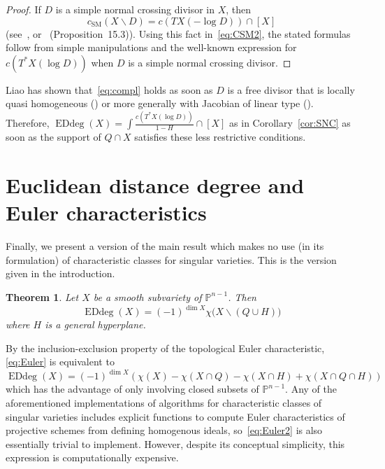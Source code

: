\documentclass[11pt]{amsart}
\newtheorem{theorem}{Theorem}[section]
\numberwithin{equation}{section}
\newcommand{\Pbb}{{\mathbb{P}}}
\newcommand{\csm}{{c_{\text{SM}}}}
\DeclareMathOperator{\Edd}{EDdeg}
\begin{document}
\begin{proof}
If $D$ is a simple normal crossing divisor in $X$, then
\begin{equation}\label{eq:compl}
\csm(X\smallsetminus D) = c(TX(-\log D))\cap [X]
\end{equation}
(see~\cite{MR2001d:14008}, or~\cite{MR1893006} (Proposition~15.3)).
Using this fact in~\eqref{eq:CSM2}, the stated formulas follow from simple 
manipulations and the well-known expression for $c(T^*X(\log D))$ when
$D$ is a simple normal crossing divisor.
\end{proof}

Liao has shown that~\eqref{eq:compl} holds as soon as $D$ is a free divisor
that is locally quasi homogeneous (\cite{Liao1}) or more generally with Jacobian
of linear type (\cite{Liao2}). Therefore, $\Edd(X) = \int \frac{c(T^*X(\log D))}{1-H}\cap [X]$
as in Corollary~\ref{cor:SNC} as soon as the support of $Q\cap X$ satisfies these 
less restrictive conditions.


\section{Euclidean distance degree and Euler characteristics}\label{s:Euler}

Finally, we present a version of the main result which makes no use (in its formulation)
of characteristic classes for singular varieties. This is the version given in the introduction.

\begin{theorem}\label{thm:Euler}
Let $X$ be a smooth subvariety of $\Pbb^{n-1}$. Then 
\begin{equation}\label{eq:Euler}
\Edd(X) = (-1)^{\dim X} \chi\big(X\smallsetminus (Q\cup H)\big)
\end{equation}
where $H$ is a general hyperplane.
\end{theorem}

By the inclusion-exclusion property of the topological Euler characteristic, \eqref{eq:Euler}
is equivalent to
\begin{equation}\label{eq:Euler2}
\Edd(X) = (-1)^{\dim X} \left(
\chi(X)-\chi(X\cap Q)-\chi(X\cap H)+\chi(X\cap Q\cap H)
\right)
\end{equation}
which has the advantage of only involving closed subsets of $\Pbb^{n-1}$. 
Any of the aforementioned implementations of algorithms for characteristic classes of
singular varieties includes explicit functions to compute Euler characteristics of
projective schemes from defining homogenous ideals, 
so~\eqref{eq:Euler2} is also essentially trivial to implement. However, despite its
conceptual simplicity, this expression is computationally expensive.
\end{document}
